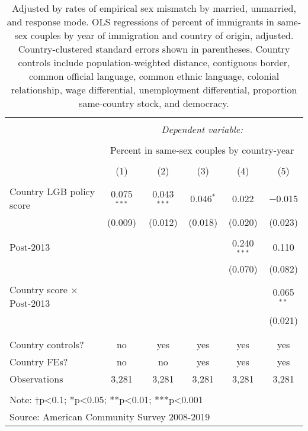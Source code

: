 \documentclass[
  11pt,
]{article}
\begin{document}
\begin{table}[!htbp] \centering 
  \caption{Adjusted by rates of empirical sex mismatch by married, unmarried, and response mode. OLS regressions of percent of immigrants in same-sex couples by year of immigration and country of origin, adjusted. Country-clustered standard errors shown in parentheses. Country controls include population-weighted distance, contiguous border, common official language, common ethnic language, colonial relationship, wage differential, unemployment differential, proportion same-country stock, and democracy.} 
  \label{tab:country-props-adj} 
\begin{tabular}{@{\extracolsep{5pt}}lccccc} 
\\[-1.8ex]\hline 
\hline \\[-1.8ex] 
 & \multicolumn{5}{c}{\textit{Dependent variable:}} \\ 
\cline{2-6} 
\\[-1.8ex] & \multicolumn{5}{c}{Percent in same-sex couples by country-year} \\ 
\\[-1.8ex] & (1) & (2) & (3) & (4) & (5)\\ 
\hline \\[-1.8ex] 
 Country LGB policy score & 0.075$^{***}$ & 0.043$^{***}$ & 0.046$^{*}$ & 0.022 & $-$0.015 \\ 
  & (0.009) & (0.012) & (0.018) & (0.020) & (0.023) \\ 
  & & & & & \\ 
 Post-2013 &  &  &  & 0.240$^{***}$ & 0.110 \\ 
  &  &  &  & (0.070) & (0.082) \\ 
  & & & & & \\ 
 Country score × Post-2013 &  &  &  &  & 0.065$^{**}$ \\ 
  &  &  &  &  & (0.021) \\ 
  & & & & & \\ 
\hline \\[-1.8ex] 
Country controls? & no & yes & yes & yes & yes \\ 
Country FEs? & no & no & yes & yes & yes \\ 
Observations & 3,281 & 3,281 & 3,281 & 3,281 & 3,281 \\ 
\hline 
\hline \\[-1.8ex] 
\multicolumn{6}{l}{Note: †p<0.1; *p<0.05; **p<0.01; ***p<0.001} \\ 
\multicolumn{6}{l}{Source: American Community Survey 2008-2019} \\ 
\end{tabular} 
\end{table}
\end{document}
